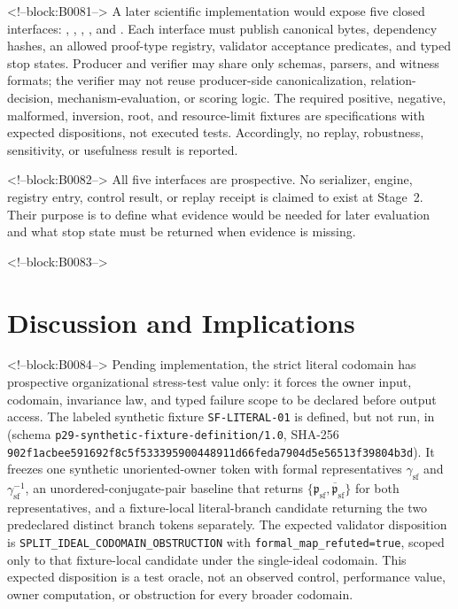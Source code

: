 \documentclass[11pt,a4paper]{article}
\begin{document}
<!--block:B0081-->
A later scientific implementation would expose five closed interfaces: , , , , and . Each interface must publish canonical bytes, dependency hashes, an allowed proof-type registry, validator acceptance predicates, and typed stop states. Producer and verifier may share only schemas, parsers, and witness formats; the verifier may not reuse producer-side canonicalization, relation-decision, mechanism-evaluation, or scoring logic. The required positive, negative, malformed, inversion, root, and resource-limit fixtures are specifications with expected dispositions, not executed tests. Accordingly, no replay, robustness, sensitivity, or usefulness result is reported.

<!--block:B0082-->
All five interfaces are prospective. No serializer, engine, registry entry, control result, or replay receipt is claimed to exist at Stage~2. Their purpose is to define what evidence would be needed for later evaluation and what stop state must be returned when evidence is missing.

<!--block:B0083-->
\section{Discussion and Implications}

<!--block:B0084-->
Pending implementation, the strict literal codomain has prospective organizational stress-test value only: it forces the owner input, codomain, invariance law, and typed failure scope to be declared before output access. The labeled synthetic fixture \texttt{SF-LITERAL-01} is defined, but not run, in  (schema \texttt{p29-synthetic-fixture-definition/1.0}, SHA-256 \texttt{902f1acb\allowbreak{}ee591692\allowbreak{}f8c5f533\allowbreak{}39590044\allowbreak{}8911d66f\allowbreak{}eda7904d\allowbreak{}5e56513f\allowbreak{}39804b3d}). It freezes one synthetic unoriented-owner token with formal representatives \(\gamma_{\mathrm{sf}}\) and \(\gamma_{\mathrm{sf}}^{-1}\), an unordered-conjugate-pair baseline that returns \(\{\mathfrak p_{\mathrm{sf}},\overline{\mathfrak p}_{\mathrm{sf}}\}\) for both representatives, and a fixture-local literal-branch candidate returning the two predeclared distinct branch tokens separately. The expected validator disposition is \texttt{SPLIT\_IDEAL\_CODOMAIN\_OBSTRUCTION} with \texttt{formal\_map\_refuted=true}, scoped only to that fixture-local candidate under the single-ideal codomain. This expected disposition is a test oracle, not an observed control, performance value, owner computation, or obstruction for every broader codomain.
\end{document}

